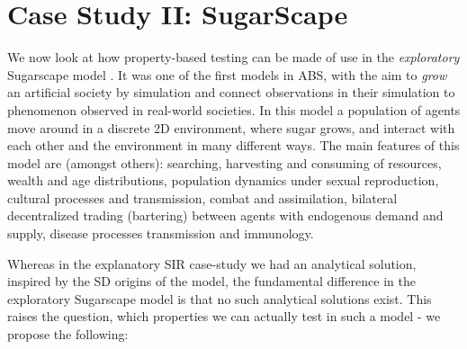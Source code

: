 \section{Case Study II: SugarScape}
\label{sec:case_sug}
We now look at how property-based testing can be made of use in the \textit{exploratory} Sugarscape model \cite{epstein_growing_1996}. It was one of the first models in ABS, with the aim to \textit{grow} an artificial society by simulation and connect observations in their simulation to phenomenon observed in real-world societies. In this model a population of agents move around in a discrete 2D environment, where sugar grows, and interact with each other and the environment in many different ways. The main features of this model are (amongst others): searching, harvesting and consuming of resources, wealth and age distributions, population dynamics under sexual reproduction, cultural processes and transmission, combat and assimilation, bilateral decentralized trading (bartering) between agents with endogenous demand and supply, disease processes transmission and immunology. %

Whereas in the explanatory SIR case-study we had an analytical solution, inspired by the SD origins of the model, the fundamental difference in the exploratory Sugarscape model is that no such analytical solutions exist. This raises the question, which properties we can actually test in such a model - we propose the following:

